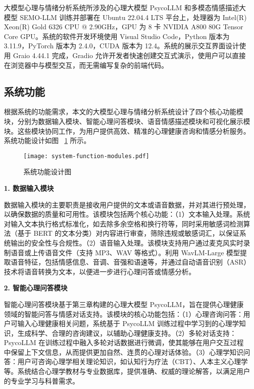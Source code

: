 大模型心理与情绪分析系统所涉及的心理大模型 PsycoLLM 和多模态情感描述大模型 SEMO-LLM 训练并部署在 Ubuntu 22.04.4 LTS 平台上，处理器为 Intel(R) Xeon(R) Gold 6326 CPU @ 2.90GHz，GPU 为 8 卡 NVIDIA A800 80G Tensor Core GPU。系统的软件开发环境使用 Visual Studio Code，Python 版本为 3.11.9，PyTorch 版本为 2.4.0，CUDA 版本为 12.4。系统的展示交互界面设计使用 Graio 4.44.1 完成，Gradio 允许开发者快速创建交互式演示，使用户可以直接在浏览器中与模型交互，而无需编写复杂的前端代码。

\subsection{系统功能}

根据系统的功能需求，本文的大模型心理与情绪分析系统设计了四个核心功能模块，分别为数据输入模块、智能心理问答模块、语音情感描述模块和可视化展示模块。这些模块协同工作，为用户提供高效、精准的心理健康咨询和情感分析服务。系统功能设计如图 ~\ref{fig:system-function-modules} 所示。

\begin{figure}[ht]
  \centering
  \texttt{[image: system-function-modules.pdf]}
  \caption{系统功能设计图}
  \label{fig:system-function-modules}
\end{figure}

\textbf{1. 数据输入模块}

数据输入模块的主要职责是接收用户提供的文本或语音数据，并对其进行预处理，以确保数据的质量和可用性。该模块包括两个核心功能：（1）文本输入处理。系统对输入文本执行格式标准化，如去除多余空格和换行符等，同时采用敏感词检测算法（基于 BERT 的文本分类）对内容进行审查，筛除违规或敏感词汇，以保证系统输出的安全性与合规性。（2）语音输入处理。该模块支持用户通过麦克风实时录制语音或上传语音文件（支持 MP3、WAV 等格式）。利用 WavLM-Large 模型提取语音特征，包括情感信息、音调、音强和语速等，并通过自动语音识别（ASR）技术将语音转换为文本，以便进一步进行心理问答或情感分析。

\textbf{2. 智能心理问答模块}

智能心理问答模块基于第三章构建的心理大模型 PsycoLLM，旨在提供心理健康领域的智能问答与情感对话支持。该模块的核心功能包括：（1）心理咨询问答：用户可输入心理健康相关问题，系统基于 PsycoLLM 训练过程中学习到的心理学知识，生成科学、合理的咨询建议，以辅助心理健康支持。（2）多轮对话支持：PsycoLLM 在训练过程中融入多轮对话数据进行微调，使其能够在用户交互过程中保留上下文信息，从而提供更加自然、连贯的心理对话体验。（3）心理学知识问答：用户可咨询心理学相关理论知识，如认知行为疗法（CBT）、人本主义心理学等。系统结合心理学教材与专业数据库，提供准确、权威的理论解答，以满足用户的专业学习与科普需求。

